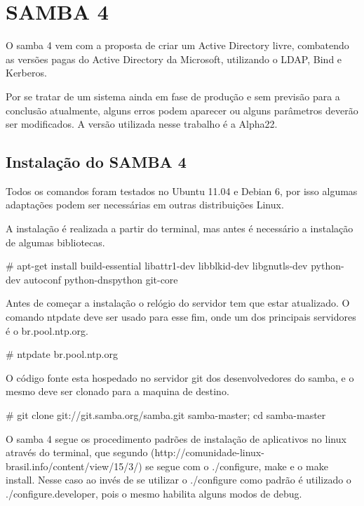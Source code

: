 \chapter{SAMBA 4}

O samba 4 vem com a proposta de criar um Active Directory livre, combatendo as versões pagas do Active Directory da Microsoft, utilizando o LDAP, Bind e Kerberos.

Por se tratar de um sistema ainda em fase de produção e sem previsão para a conclusão atualmente, alguns erros podem aparecer ou alguns parâmetros deverão ser modificados. A versão utilizada nesse trabalho é a Alpha22.

\section{Instalação do SAMBA 4}

Todos os comandos foram testados no Ubuntu 11.04 e Debian 6, por isso algumas adaptações podem ser necessárias em outras distribuições Linux.

A instalação é realizada a partir do terminal, mas antes é necessário a instalação de algumas bibliotecas.

\# apt-get install build-essential libattr1-dev libblkid-dev libgnutls-dev python-dev autoconf python-dnspython git-core

Antes de começar a instalação o relógio do servidor tem que estar atualizado. O comando ntpdate deve ser usado para esse fim, onde um dos principais servidores é o br.pool.ntp.org.

\# ntpdate br.pool.ntp.org



O código fonte esta hospedado no servidor git dos desenvolvedores do samba, e o mesmo deve ser clonado para a maquina de destino.

\# git clone git://git.samba.org/samba.git samba-master; cd samba-master

O samba 4 segue os procedimento padrões de instalação de aplicativos no linux através do terminal, que segundo (http://comunidade-linux-brasil.info/content/view/15/3/) se segue com o ./configure, make e o make install.
Nesse caso ao invés de se utilizar o ./configure como padrão é utilizado o ./configure.developer, pois o mesmo habilita alguns modos de debug.

